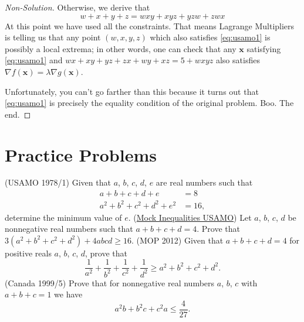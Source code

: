 \documentclass[11pt]{scrartcl}
\begin{document}
\begin{proof}[Non-Solution]
  Otherwise, we derive that
  \begin{equation}
    w+x+y+z = wxy+xyz+yzw+zwx
    \label{eq:usamo1}
  \end{equation}
  At this point we have used all the constraints.
  That means Lagrange Multipliers is telling us that any point $(w,x,y,z)$
  which also satisfies \eqref{eq:usamo1} is possibly a local extrema;
  in other words, one can check that any $\mathbf{x}$ satisfying \eqref{eq:usamo1}
  and $wx+xy+yz+zx+wy+xz = 5+wxyz$ also satisfies
  $\nabla f(\mathbf{x}) = \lambda \nabla g(\mathbf{x})$.

  Unfortunately, you can't go farther than this because it turns out
  that \eqref{eq:usamo1} is precisely the equality condition of the original problem.
  Boo. The end.
\end{proof}

\section{Practice Problems}
\begin{enumerate}
  \ii (USAMO 1978/1) Given that $a$, $b$, $c$, $d$, $e$ are real numbers such that
  \begin{align*}
    a+b+c+d+e &= 8 \\
    a^2+b^2+c^2+d^2+e^2 &= 16,
  \end{align*}
  determine the minimum value of $e$.
  \ii (\href{http://www.aops.com/community/h492263}{Mock Inequalities USAMO})
  Let $a$, $b$, $c$, $d$ be nonnegative real numbers such that $a+b+c+d=4$.
  Prove that $3(a^2+b^2+c^2+d^2) + 4abcd \ge 16$.
  \ii (MOP 2012) Given that $a+b+c+d=4$ for positive reals $a$, $b$, $c$, $d$, prove that
  \[ \frac{1}{a^2} + \frac{1}{b^2} + \frac{1}{c^2} + \frac{1}{d^2}
    \ge a^2+b^2+c^2+d^2. \]
  \ii (Canada 1999/5) Prove that for nonnegative real numbers $a$, $b$, $c$
  with $a+b+c=1$ we have \[ a^2b + b^2c + c^2a \le \frac{4}{27}. \]
\end{enumerate}
\end{document}

